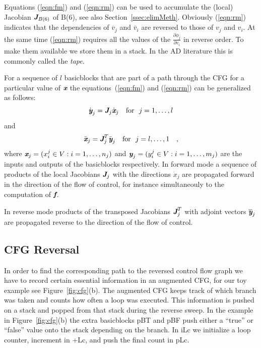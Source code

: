 \documentclass[acmtocl,acmnow]{acmtrans2m}
\newcommand{\basicblock}{basicblock}
\newcommand{\bmf}{\mbox{\bf\em f}}
\newcommand{\bmJ}{\mbox{\bf\em J}}
\newcommand{\bmx}{\mbox{\bf\em x}}
\newcommand{\bmy}{\mbox{\bf\em y}}
\newcommand{\refeqn}[1]{(\ref{#1})}
\newcommand{\reffig}[1]{Figure~\ref{#1}}
\newcommand{\refsec}[1]{Section~\ref{#1}}
\begin{document}
Equations \refeqn{eqn:fm} and \refeqn{eqn:rm} can be used to accumulate 
the (local) Jacobian $\bmJ_{B(6)}$
of B(6), see also \refsec{ssec:elimMeth}. 
Obviously \refeqn{eqn:rm}  indicates that the dependencies of $\overline{v}_j$ and 
$\overline{v}_i$ are reversed to those of $v_j$ and $v_i$. At the same time \refeqn{eqn:rm}
requires all the values of the $\frac{\partial \phi_j}{\partial v_i}$ in reverse order. To make them 
available we store them in a stack. In the  AD literature this is commonly called the {\em tape}. 


For a sequence of $l$ {\basicblock}s that are part of 
a path through the CFG for a particular value of $\bmx$ the 
equations~(\ref{eqn:fm}) and (\ref{eqn:rm}) can be generalized as follows:
\begin{equation} \label{eqn:bbfm}
\dot{\bmy}_j=\bmJ_j \dot{\bmx}_j \quad \text{for}~~j=1,\ldots,l
\end{equation} 
and 
\begin{equation} \label{eqn:bbrm}
\bar{\bmx}_j=\bmJ^T_j \bar{\bmy}_j \quad \text{for}~~j=l,\ldots,1\quad ,
\end{equation} 
where $\bmx_j = (x^j_i \in V :  i=1,\ldots,n_j)$ and
$\bmy_j = (y^j_i \in V : i=1,\ldots,m_j)$ are the inputs and outputs of the 
{\basicblock}s
respectively. 
In forward mode a sequence of 
products of the local Jacobians $\bmJ_j$ 
with the directions $\dot{x}_j$ 
are propagated forward in the direction of the flow of control, for 
instance simultaneouly to the computation of $\bmf$.
 
In reverse mode products of the transposed
Jacobians $\bmJ^T_j$ with adjoint vectors $\overline{\bmy}_j$
are propagated reverse to the direction of the flow of control. 
\subsection{CFG Reversal} \label{ssec:cfgReversal}
In order to find the corresponding path to the reversed control flow graph 
we have to record certain essential information in an augmented CFG,
for our toy example see \reffig{fig:cfg}(b).
The augmented CFG  keeps track of which branch was taken and counts how often a loop was 
executed.  
This information is pushed on  a stack and popped from that stack during the 
reverse sweep.  
In the example in \reffig{fig:cfg}(b) the extra {\basicblock}s pBT and pBF push 
either a ``true'' or ``false'' value onto the stack depending on the branch. 
In iLc we initialize a loop counter, increment in +Lc, and push the final 
count in pLc. 
\end{document}
